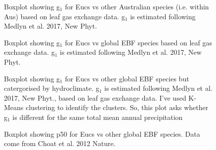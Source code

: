 \documentclass[12pt,a4paper,oneside]{article}
\begin{document}
\FloatBarrier

\begin{figure}[!hbtp]
\centering
{}
\caption{\small{Boxplot showing g$_1$ for Eucs vs other Australian species (i.e. within Aus) based on leaf gas exchange data. g$_1$ is estimated following Medlyn et al. 2017, New Phyt.}}
\label{}
\end{figure}

\FloatBarrier

\begin{figure}[!hbtp]
\centering
{}
\caption{\small{Boxplot showing g$_1$ for Eucs vs global EBF species based on leaf gas exchange data. g$_1$ is estimated following Medlyn et al. 2017, New Phyt.}}
\label{}
\end{figure}

\FloatBarrier

\begin{figure}[!hbtp]
\centering
{}
\caption{\small{Boxplot showing g$_1$ for Eucs vs other global EBF species but catergorised by hydroclimate. g$_1$ is estimated following Medlyn et al. 2017, New Phyt., based on leaf gas exchange data. I've used K-Means clustering to identify the clusters. So, this plot asks whether g$_1$ is different for the same total mean annual precipitation}}
\label{}
\end{figure}


\FloatBarrier

\begin{figure}[!hbtp]
\centering
{}
\caption{\small{Boxplot showing p50 for Eucs vs other global EBF species. Data come from Choat et al. 2012 Nature.}}
\label{}
\end{figure}
\end{document}
